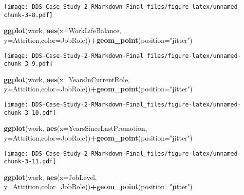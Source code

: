 \documentclass[]{article}
\newenvironment{Shaded}{\begin{snugshade}}{\end{snugshade}}
\newcommand{\DataTypeTok}[1]{\textcolor[rgb]{0.13,0.29,0.53}{#1}}
\newcommand{\KeywordTok}[1]{\textcolor[rgb]{0.13,0.29,0.53}{\textbf{#1}}}
\newcommand{\NormalTok}[1]{#1}
\newcommand{\OperatorTok}[1]{\textcolor[rgb]{0.81,0.36,0.00}{\textbf{#1}}}
\newcommand{\StringTok}[1]{\textcolor[rgb]{0.31,0.60,0.02}{#1}}
\begin{document}
\texttt{[image: DDS-Case-Study-2-RMarkdown-Final\_files/figure-latex/unnamed-chunk-3-8.pdf]}

\begin{Shaded}
\begin{Highlighting}[]
\KeywordTok{ggplot}\NormalTok{(work, }\KeywordTok{aes}\NormalTok{(}\DataTypeTok{x=}\NormalTok{WorkLifeBalance, }\DataTypeTok{y=}\NormalTok{Attrition,}\DataTypeTok{color=}\NormalTok{JobRole))}\OperatorTok{+}\KeywordTok{geom_point}\NormalTok{(}\DataTypeTok{position=}\StringTok{"jitter"}\NormalTok{)}
\end{Highlighting}
\end{Shaded}

\texttt{[image: DDS-Case-Study-2-RMarkdown-Final\_files/figure-latex/unnamed-chunk-3-9.pdf]}

\begin{Shaded}
\begin{Highlighting}[]
\KeywordTok{ggplot}\NormalTok{(work, }\KeywordTok{aes}\NormalTok{(}\DataTypeTok{x=}\NormalTok{YearsInCurrentRole, }\DataTypeTok{y=}\NormalTok{Attrition,}\DataTypeTok{color=}\NormalTok{JobRole))}\OperatorTok{+}\KeywordTok{geom_point}\NormalTok{(}\DataTypeTok{position=}\StringTok{"jitter"}\NormalTok{)}
\end{Highlighting}
\end{Shaded}

\texttt{[image: DDS-Case-Study-2-RMarkdown-Final\_files/figure-latex/unnamed-chunk-3-10.pdf]}

\begin{Shaded}
\begin{Highlighting}[]
\KeywordTok{ggplot}\NormalTok{(work, }\KeywordTok{aes}\NormalTok{(}\DataTypeTok{x=}\NormalTok{YearsSinceLastPromotion, }\DataTypeTok{y=}\NormalTok{Attrition,}\DataTypeTok{color=}\NormalTok{JobRole))}\OperatorTok{+}\KeywordTok{geom_point}\NormalTok{(}\DataTypeTok{position=}\StringTok{"jitter"}\NormalTok{)}
\end{Highlighting}
\end{Shaded}

\texttt{[image: DDS-Case-Study-2-RMarkdown-Final\_files/figure-latex/unnamed-chunk-3-11.pdf]}

\begin{Shaded}
\begin{Highlighting}[]
\KeywordTok{ggplot}\NormalTok{(work, }\KeywordTok{aes}\NormalTok{(}\DataTypeTok{x=}\NormalTok{JobLevel, }\DataTypeTok{y=}\NormalTok{Attrition,}\DataTypeTok{color=}\NormalTok{JobRole))}\OperatorTok{+}\KeywordTok{geom_point}\NormalTok{(}\DataTypeTok{position=}\StringTok{"jitter"}\NormalTok{)}
\end{Highlighting}
\end{Shaded}
\end{document}
